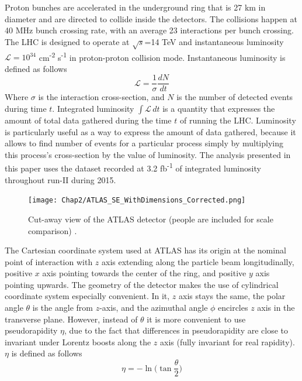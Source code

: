 Proton bunches are accelerated in the underground ring that is 27 km in diameter and are directed to collide inside the detectors. The collisions happen at 40 MHz bunch crossing rate, with an average 23 interactions per bunch crossing. The LHC is designed to operate at $\sqrt{s}$=14 TeV and instantaneous luminosity $\mathcal{L} = 10^{34}$ cm\textsuperscript{-2} s\textsuperscript{-1} in proton-proton collision mode. Instantaneous luminosity is defined as follows
\begin{equation}
\mathcal{L} = \frac{1}{\sigma}\frac{dN}{dt}
\end{equation}  
Where $\sigma$ is the interaction cross-section, and $N$ is the number of detected events during time $t$. Integrated luminosity $\int \mathcal{L}\, dt$ is a quantity that expresses the amount of total data gathered during the time $t$ of running the LHC. Luminosity  is particularly useful as a way to express the amount of data gathered, because it allows to find number of events for a particular process simply by multiplying this process's cross-section by the value of luminosity. The analysis presented in this paper uses the dataset recorded at 3.2 fb\textsuperscript{-1} of integrated luminosity throughout run-II during 2015. 


\begin{figure}[!t]
	\centering
    \captionsetup{width=\textwidth}
	\texttt{[image: Chap2/ATLAS\_SE\_WithDimensions\_Corrected.png]}
\caption{\label{fig:detector}  Cut-away view of the ATLAS detector (people are included for scale comparison) \citep{aad2008atlas}. }
\end{figure}

The Cartesian coordinate system used at ATLAS has its origin at the nominal point of interaction with $z$ axis extending along the particle beam longitudinally, positive $x$ axis pointing towards the center of the ring, and positive $y$ axis pointing upwards. 
The geometry of the detector makes the use of cylindrical coordinate system especially convenient. In it, $z$ axis stays the same, the polar angle $\theta$ is the angle from $z$-axis, and the azimuthal angle $\phi$ encircles $z$ axis in the transverse plane. However, instead of $\theta$ it is more convenient to use pseudorapidity $\eta$, due to the fact that differences in pseudorapidity are close to invariant under Lorentz boosts along the $z$ axis (fully invariant for real rapidity). $\eta$ is defined as follows
\begin{equation}
\eta = -\ln\biggl(\tan\frac{\theta}{2}\biggr)
\end{equation}

